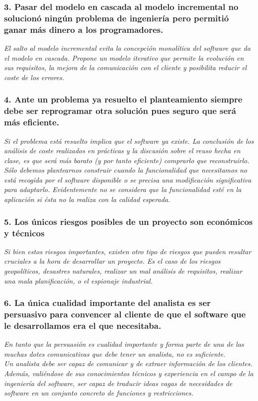 \subsubsection*{3. Pasar del modelo en cascada al modelo incremental no solucionó ningún problema de ingeniería pero permitió ganar más dinero a los programadores.}
\textit{El salto al modelo incremental evita la concepción monolítica del software que da el modelo en cascada. Propone un modelo iterativo que permite la evolución en sus requisitos, la mejora de la comunicación con el cliente y posibilita reducir el coste de los errores.}

\subsubsection*{4. Ante un problema ya resuelto el planteamiento siempre debe ser reprogramar otra solución pues seguro que será más eficiente.}
\textit{Si el problema está resuelto implica que el software ya existe. La conclusión de los análisis de coste realizados en prácticas y la discusión sobre el reuso hecha en clase, es que será más barato (y por tanto eficiente) comprarlo que reconstruirlo. Sólo debemos plantearnos construir cuando la funcionalidad que necesitamos no está recogida por el software disponible o se precisa una modificación significativa para adaptarlo. Evidentemente no se considera que la funcionalidad esté en la aplicación si ésta no la realiza con la calidad esperada.}

\subsubsection*{5. Los únicos riesgos posibles de un proyecto son económicos y técnicos}
\textit{Si bien estos riesgos importantes, existen otro tipo de riesgos que pueden resultar cruciales a la hora de desarrollar un proyecto. Es el caso de los riesgos geopolíticos, desastres naturales, realizar un mal análisis de requisitos, realizar una mala planificación, o el espionaje industrial.}

\subsubsection*{6. La única cualidad importante del analista es ser persuasivo para convencer al cliente de que el software que le desarrollamos era el que necesitaba.}
\textit{En tanto que la persuasión es cualidad importante y forma parte de una de las muchas dotes comunicativas que debe tener un analista, no es suficiente.
\\
Un analista debe ser capaz de comunicar y de extraer información de los clientes.\\
Además, valiéndose de sus conocimientos técnicos y experiencia en el campo de la ingeniería del software, ser capaz de traducir ideas vagas de necesidades de software en un conjunto concreto de funciones y restricciones.
}


